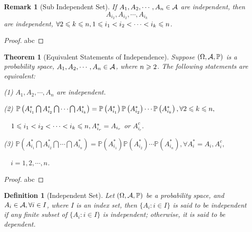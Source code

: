 \documentclass[openany,12pt]{book}
\newtheorem{theorem}{Theorem}[chapter]
\newtheorem{remark}{Remark}[chapter]
\newtheorem{definition}{Definition}[chapter]
\begin{document}
\begin{remark}[Sub Independent Set]
  If $A_1,A_2, \cdots,A_n\in\mathcal{A}$ are independent, then $$A_{i_2},A_{i_2}, \cdots,A_{i_k}$$ are independent, $\forall 2\leqslant k\leqslant n, 1\leqslant i_1<i_2<\cdots <i_k\leqslant n$.
\end{remark}

\begin{proof}
  abc
\end{proof}

\begin{theorem}[Equivalent Statements of Independence]
  Suppose $(\Omega,\mathcal{A},\mathbb{P})$ is a probability space, $A_1,A_2, \cdots,A_n\in\mathcal{A}$, where $n\geqslant2$. The following statements are equivalent:

  (1) $A_1,A_2, \cdots,A_n$ are independent.

  (2) $\mathbb{P}\left(A_{i_1}^*\bigcap A_{i_2}^*\bigcap\cdots\bigcap A_{i_k}^*\right)=\mathbb{P}\left(A_{i_1}^*\right) \mathbb{P}\left(A_{i_2}^* \right)\cdots \mathbb{P}\left(A_{i_k}^* \right), \forall 2\leqslant k\leqslant n,$

  $\quad  1\leqslant i_1<i_2<\cdots <i_k\leqslant n, A_{i_r}^*=A_{i_r}$ or $A_{i_r}^c$.

  (3) $\mathbb{P}\left(A_{i_1}^*\bigcap A_{i_2}^*\bigcap\cdots\bigcap A_{i_n}^*\right)=\mathbb{P}\left(A_{i_1}^* \right)\mathbb{P}\left(A_{i_2}^* \right)\cdots \mathbb{P}\left(A_{i_n}^* \right), \forall A_i^*=A_i, A_i^c,$

  $\quad   i=1,2, \cdots,n$.

\end{theorem}

\begin{proof}
  abc
\end{proof}

\begin{definition}[Independent Set]
  Let $(\Omega,\mathcal{A},\mathbb{P})$ be a probability space, and $A_i\in\mathcal{A}, \forall i\in I$, where $I$ is an index set, then $\{A_i: i\in I\}$ is said to be independent if any finite subset of $\{A_i: i\in I\}$ is independent; otherwise, it is said to be dependent.
\end{definition}
\end{document}
